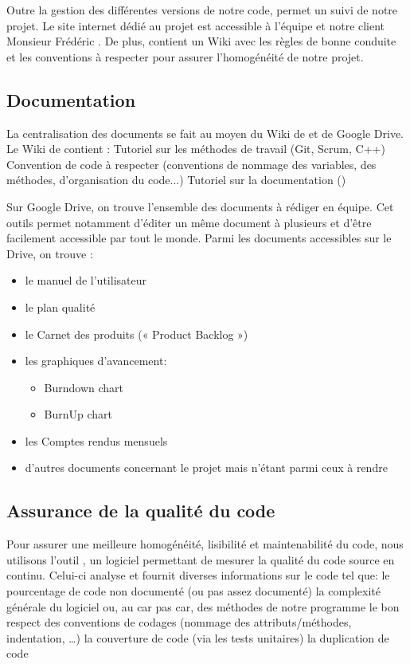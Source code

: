 Outre la gestion des différentes versions de notre code,  permet un suivi de notre projet. Le site internet  dédié au projet est accessible à l’équipe et notre client Monsieur Frédéric . 
De plus,  contient un Wiki avec les règles de bonne conduite et les conventions à respecter pour assurer l’homogénéité de notre projet. 

\subsection{Documentation}
La centralisation des documents se fait au moyen du Wiki de  et de Google Drive. 
Le Wiki de  contient :
Tutoriel sur les méthodes de travail (Git, Scrum, C++)
Convention de code à respecter (conventions de nommage des variables, des méthodes, d’organisation du code...)
Tutoriel sur la documentation ()

Sur Google Drive, on trouve l’ensemble des documents à rédiger en équipe. Cet outils permet notamment d’éditer un même document à plusieurs et d’être facilement accessible par tout le monde. Parmi les documents accessibles sur le Drive, on trouve :
\begin{itemize}
	\item le manuel de l’utilisateur
	\item le plan qualité 
	\item le Carnet des produits (« Product Backlog »)
	\item les graphiques d’avancement:
	\begin{itemize}
		\item Burndown chart
		\item BurnUp chart
	\end{itemize}
	\item les Comptes rendus mensuels
	\item d’autres documents concernant le projet mais n’étant parmi ceux à rendre
\end{itemize}
 
\subsection{Assurance de la qualité du code}
Pour assurer une meilleure homogénéité, lisibilité et maintenabilité du code, nous utilisons l’outil , un logiciel permettant de mesurer la qualité du code source  en continu. 
Celui-ci analyse et fournit diverses informations sur le code tel que:
le pourcentage de code non documenté (ou pas assez documenté)
la complexité générale du logiciel ou, au car pas car, des méthodes de notre programme
le bon respect des conventions de codages (nommage des attributs/méthodes, indentation, …)
la couverture de code (via les tests unitaires)
la duplication de code